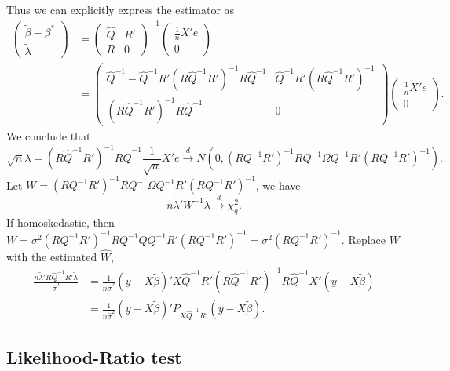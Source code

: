 \documentclass[11pt]{article}
\renewcommand{\hat}{\widehat}
\begin{document}
Thus we can explicitly express the estimator as
\[\begin{aligned}
  \begin{pmatrix}\tilde{\beta}-\beta^{*}\\
\tilde{\lambda}
\end{pmatrix}
& =\begin{pmatrix}\widehat{Q} & R'\\
R & 0
\end{pmatrix}^{-1}
\begin{pmatrix}\frac{1}{n}X'e\\
0
\end{pmatrix}\\
 & =  \begin{pmatrix}\widehat{Q}^{-1}-\widehat{Q}^{-1}R'\left(R\widehat{Q}^{-1}R'\right)^{-1}R\widehat{Q}^{-1} & \widehat{Q}^{-1}R'\left(R\widehat{Q}^{-1}R'\right)^{-1}\\
\left(R\widehat{Q}^{-1}R'\right)^{-1}R\widehat{Q}^{-1}  & 0
\end{pmatrix}
\begin{pmatrix}\frac{1}{n}X'e\\
0
\end{pmatrix}.\end{aligned}\]
We conclude that
\[
\sqrt{n}\tilde{\lambda}=\left(R\widehat{Q}^{-1}R'\right)^{-1}R\widehat{Q}^{-1}\frac{1}{\sqrt{n}}X'e \stackrel{d}{\to} N\left(0,\left(RQ^{-1}R'\right)^{-1}RQ^{-1}\Omega Q^{-1}R'\left(RQ^{-1}R'\right)^{-1}\right).\]
Let
\(W=\left(RQ^{-1}R'\right)^{-1}RQ^{-1}\Omega Q^{-1}R'\left(RQ^{-1}R'\right)^{-1}\),
we have
\[n\tilde{\lambda}'W^{-1}\tilde{\lambda}\stackrel{d}{\to} \chi_{q}^{2}.\] If
homoskedastic, then
\(W=\sigma^{2}\left(RQ^{-1}R'\right)^{-1}RQ^{-1}QQ^{-1}R'\left(RQ^{-1}R'\right)^{-1}=\sigma^{2}\left(RQ^{-1}R'\right)^{-1}.\)
Replace $W$ with the estimated $\hat{W}$,
\[\begin{aligned}
\frac{n\tilde{\lambda}'R\hat{Q}^{-1}R'\tilde{\lambda}}{\hat{\sigma}^{2}} 
& =\frac{1}{n\hat{\sigma}^{2}}\left(y-X\tilde{\beta}\right)'X \hat{Q}^{-1} R'
(R \hat{Q}^{-1} R')^{-1}
R \hat{Q}^{-1}
X'\left(y-X\tilde{\beta}\right)\\
 & =\frac{1}{n\hat{\sigma}^{2}}\left(y-X\tilde{\beta}\right)'P_{X \hat{Q}^{-1} R'}\left(y-X\tilde{\beta}\right).\end{aligned}\]

    \subsection{Likelihood-Ratio test}\label{likelihood-ratio-test}
\end{document}
